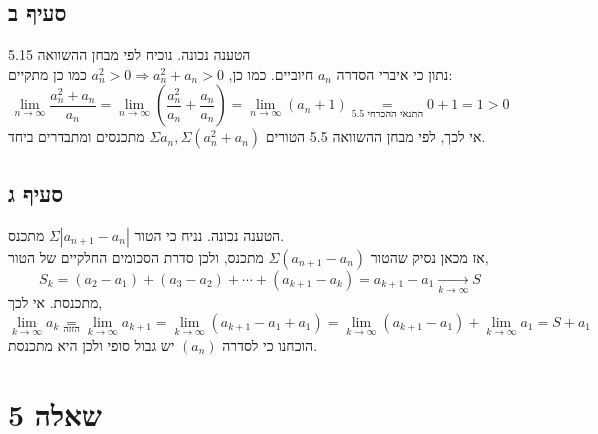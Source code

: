 \documentclass{article}
\newcommand\underrel[2]{\mathrel{\mathop{#2}\limits_{#1}}}
\begin{document}
\subsection*{סעיף ב}

הטענה נכונה. נוכיח לפי מבחן ההשוואה 5.15
\\
נתון כי איברי הסדרה $a_n$ חיוביים. כמו כן, $a_n^2>0\Rightarrow a_n^2+a_n>0$
כמו כן מתקיים:
\[
    \lim_{n\rightarrow \infty} \frac{a_n^2+a_n}{a_n}=
    \lim_{n\rightarrow \infty} \left(\frac{a_n^2}{a_n}+\frac{a_n}{a_n}\right)=
    \lim_{n\rightarrow \infty} (a_n+1) \underrel{\text{התנאי ההכרחי 5.5}}{=}
    0+1=1>0
\]
אי לכך, לפי מבחן ההשוואה 5.5 הטורים $\Sigma a_n, \Sigma (a_n^2+a_n)$ מתכנסים ומתבדרים ביחד.

\subsection*{סעיף ג}

הטענה נכונה. נניח כי הטור $\Sigma|a_{n+1}-a_n|$ מתכנס.  \\
אז מכאן נסיק שהטור $\Sigma(a_{n+1}-a_n)$ מתכנס,
ולכן סדרת הסכומים החלקיים של הטור,
\[
    S_k=(a_2-a_1)+(a_3-a_2)+\cdots+(a_{k+1}-a_k)=a_{k+1}-a_1 \xrightarrow[k\rightarrow\infty]{} S
\]
מתכנסת.
אי לכך,
\[
    \lim_{k\rightarrow \infty} a_k \underrel{\text{הזזה}}{=}
    \lim_{k\rightarrow \infty} a_{k+1} =
    \lim_{k\rightarrow \infty} (a_{k+1}-a_1+a_1) =
    \lim_{k\rightarrow \infty} (a_{k+1}-a_1) + \lim_{k\rightarrow \infty}a_1 =
    S+a_1
\]
הוכחנו כי לסדרה $(a_n)$ יש גבול סופי ולכן היא מתכנסת.

\pagebreak

\section*{שאלה 5}
\end{document}
